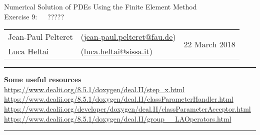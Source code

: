\documentclass[11pt,answers]{exam}
\makeatletter
\newcommand{\makeheader}[3]{%
\setcounter{question}{0}
\begin{center}
{\sc Numerical Solution of PDEs Using the Finite Element Method}\vspace{2ex}\\
{\sc Exercise #1:\ \ \ #2}\vspace{2ex}\\
\begin{tabular*}{\textwidth}{ll @{\extracolsep{\fill}}r}
Jean-Paul Pelteret & (\url{jean-paul.pelteret@fau.de}) & \multirow{2}{*}{#3} \\
Luca Heltai & (\url{luca.heltai@sissa.it}) & \\
\end{tabular*}
\end{center}
}
\newcommand{\makeresources}[1]{%
\rule{\textwidth}{0.6mm}
\textbf{Some useful resources}\\[1.5ex]
#1 \par
\rule{\textwidth}{0.6mm}
}
\makeatother
\begin{document}
%
%
%
%
%
%




\clearpage
\makeheader{9}{?????}{22 March 2018}
\makeresources{%
\url{https://www.dealii.org/8.5.1/doxygen/deal.II/step_x.html} \\
\url{https://www.dealii.org/8.5.1/doxygen/deal.II/classParameterHandler.html} \\
\url{https://www.dealii.org/developer/doxygen/deal.II/classParameterAcceptor.html} \\
\url{https://www.dealii.org/8.5.1/doxygen/deal.II/group__LAOperators.html}
}
\end{document}
